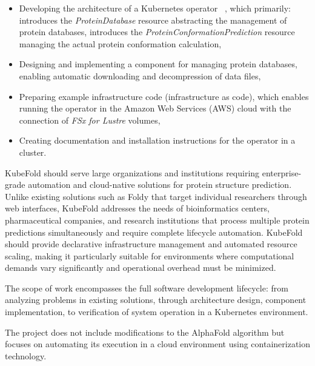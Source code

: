 \begin{itemize}
    \item Developing the architecture of a Kubernetes operator ~\cite{k8s_operators}, which primarily:
    \subitem introduces the \textit{ProteinDatabase} resource abstracting the management of protein databases,
    \subitem introduces the \textit{ProteinConformationPrediction} resource managing the actual protein conformation calculation,
    \item Designing and implementing a component for managing protein databases, enabling automatic downloading and decompression of data files,
    \item Preparing example infrastructure code (infrastructure as code), which enables running the operator in the Amazon Web Services (AWS) cloud with the connection of \textit{FSx for Lustre} volumes,
    \item Creating documentation and installation instructions for the operator in a cluster.
\end{itemize}

KubeFold should serve large organizations and institutions requiring enterprise-grade automation and cloud-native solutions for protein structure prediction. Unlike existing solutions such as Foldy that target individual researchers through web interfaces, KubeFold addresses the needs of bioinformatics centers, pharmaceutical companies, and research institutions that process multiple protein predictions simultaneously and require complete lifecycle automation. KubeFold should provide declarative infrastructure management and automated resource scaling, making it particularly suitable for environments where computational demands vary significantly and operational overhead must be minimized.

The scope of work encompasses the full software development lifecycle: from analyzing problems in existing solutions, through architecture design, component implementation, to verification of system operation in a Kubernetes environment.

The project does not include modifications to the AlphaFold algorithm but focuses on automating its execution in a cloud environment using containerization technology.
